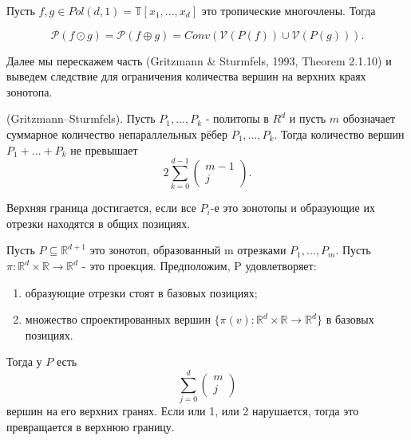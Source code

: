 \documentclass[russian]{lecture-notes}
\begin{document}
	\begin{Proposition}
		Пусть $f, g \in Pol(d,1) = \mathbb{T}[x_1,...,x_d]$ это тропические многочлены. Тогда
		
		\begin{equation}
			\mathcal{P}(f \odot g) = \mathcal{P}(f \oplus g) = Conv(\mathcal{V}(P(f)) \cup \mathcal{V}(P(g))).
		\end{equation}
	\end{Proposition}

	Далее мы перескажем часть (Gritzmann \& Sturmfels, 1993, Theorem 2.1.10) и выведем следствие для ограничения количества вершин на верхних краях зонотопа.
	
	\begin{Theorem}
		(Gritzmann–Sturmfels). Пусть $P_1,...,P_k$ - политопы в $R^d$ и пусть $m$ обозначает суммарное количество непараллельных рёбер $P_1,...,P_k$. Тогда количество вершин $P_1+...+P_k$ не превышает
		\begin{equation*}
			2 \sum_{k=0}^{d-1} 
			\begin{pmatrix} 
			m-1 \\ 
			j 
			\end{pmatrix}.
		\end{equation*}
		
		Верхняя граница достигается, если все $P_i$-е это зонотопы и образующие их отрезки находятся в общих позициях.
	\end{Theorem}

	\begin{Corollary}
		Пусть $P \subseteq \mathbb{R}^{d+1}$ это зонотоп, образованный m отрезками $P_1,...,P_m$. Пусть $\pi : \mathbb{R}^d \times \mathbb{R} \to \mathbb{R}^d$ - это проекция. Предположим, P удовлетворяет:
		\begin{enumerate}
			\item образующие отрезки стоят в базовых позициях; 
			\item множество спроектированных вершин $\{\pi(v) : \mathbb{R}^d \times \mathbb{R} \to \mathbb{R}^d\}$ в базовых позициях.
		\end{enumerate}
		
		Тогда у $P$ есть
		\begin{equation*}
			\sum_{j=0}^d
			\begin{pmatrix}
			m \\
			j
			\end{pmatrix}
		\end{equation*}
		 вершин на его верхних гранях. Если или 1, или 2 нарушается, тогда это превращается в верхнюю границу.
	\end{Corollary}
\end{document}
